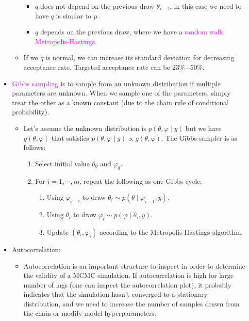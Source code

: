 \documentclass[UTF8]{book}
\newcommand{\concept}[1]{\textcolor{magenta}{#1}}
\begin{document}
\begin{itemize}
\begin{itemize}
	\begin{itemize}
		\item $q$ does not depend on the previous draw $\theta_{i-1}$, in this case we need to have $q$ is similar to $p$.
		\item $q$ depends on the previous draw, where we have a \concept{random walk Metropolis-Hastings}.
	\end{itemize}
	\item If we $q$ is normal, we can increase its standard deviation for decreasing acceptance rate. Targeted acceptance rate can be 23\%$-50\%$.
\end{itemize}
\item \concept{Gibbs sampling} is to sample from an unknown distribution if multiple parameters are unknown. When we sample one of the parameters, simply treat the other as a known constant (due to the chain rule of conditional probability).
\begin{itemize}
	\item Let's assume the unknown distribution is $p(\theta,\varphi\mid y)$ but we have $g(\theta,\varphi)$ that satisfies $p(\theta,\varphi\mid y)\propto g(\theta,\varphi)$. The Gibbs sampler is as follows:
\begin{enumerate}
	\item Select initial value $\theta_0$ and $\varphi_0$.
	\item For $i=1,\cdots,m$, repeat the following as one Gibbs cycle:
	\begin{enumerate}
		\item Using $\varphi_{i-1}$ to draw $\theta_i\sim p(\theta\mid\varphi_{i-1}, y)$.
		\item Using $\theta_{i}$ to draw $\varphi_i\sim p(\varphi\mid\theta_{i}, y)$.
		\item Update $(\theta_i,\varphi_i)$ according to the Metropolis-Hastings algorithm.
	\end{enumerate}		
\end{enumerate}
\end{itemize}
\item Autocorrelation:
\begin{itemize}
	\item Autocorrelation is an important structure to inspect in order to determine the validity of a MCMC simulation. If autocorrelation is high for large number of lags (one can inspect the autocorrelation plot), it probably indicates that the simulation hasn't converged to a stationary distribution, and we need to increase the number of samples drawn from the chain or modify model hyperparameters.

\end{itemize}
\end{itemize}
\end{document}
